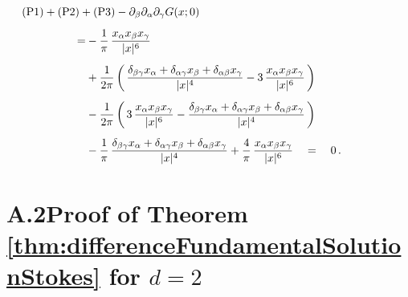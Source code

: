 \begin{samepage}
\begin{align*}
  &\hspace{-2cm}\mathrm{(P1)} + \mathrm{(P2)} + \mathrm{(P3)} - \partial_\beta \partial_\alpha \partial_\gamma G(x; 0) \\[0.5em]
  = &- \frac{1}{\pi}\, \frac{x_\alpha x_\beta x_\gamma}{|x|^6} \\[0.5em]
    &+ \frac{1}{2\pi} \, \bigg(\,\frac{\delta_{\beta\gamma} x_\alpha + \delta_{\alpha \gamma} x_\beta + \delta_{\alpha \beta} x_\gamma}{|x|^4} - 3\, \frac{x_\alpha x_\beta x_\gamma}{|x|^6} \, \bigg) \\[0.5em]
    &- \frac{1}{2\pi} \, \bigg( \, 3\, \frac{x_\alpha x_\beta x_\gamma}{|x|^6} - \frac{\delta_{\beta\gamma} x_\alpha + \delta_{\alpha\gamma} x_\beta + \delta_{\alpha\beta} x_\gamma}{|x|^4} \, \bigg)\\[0.5em]
   &- \frac{1}{\pi}\, \frac{\delta_{\beta \gamma} x_\alpha + \delta_{\alpha \gamma} x_\beta + \delta_{\alpha\beta} x_\gamma}{|x|^4} 
     + \frac{4}{\pi}\, \frac{x_\alpha x_\beta x_\gamma}{|x|^6} 
     \quad=\quad 0 \,.
\end{align*}
\end{samepage}


\section*{A.2\quad Proof of Theorem \ref{thm:differenceFundamentalSolutionStokes} for $d = 2$}
\label{sec:A2}

